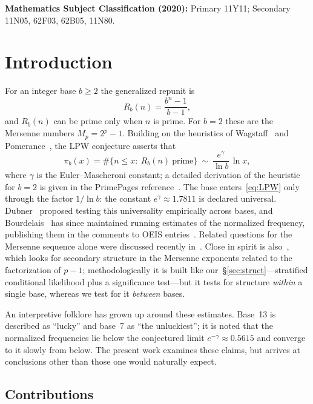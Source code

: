 \documentclass[11pt,a4paper]{article}
\theoremstyle{plain}
\theoremstyle{remark}
\newcommand{\Rb}{R_b}
\newcommand{\eg}{e^{\gamma}}
\newcommand{\emg}{e^{-\gamma}}
\begin{document}
\medskip
\noindent\textbf{Mathematics Subject Classification (2020):}
Primary 11Y11; Secondary 11N05, 62F03, 62B05, 11N80.

\section{Introduction}

For an integer base $b\ge2$ the generalized repunit is
\begin{equation}\label{eq:Rb}
\Rb(n)=\frac{b^{n}-1}{b-1},
\end{equation}
and $\Rb(n)$ can be prime only when $n$ is prime. For $b=2$ these are the
Mersenne numbers $M_p=2^{p}-1$. Building on the heuristics of
Wagstaff~\cite{wagstaff1983} and Pomerance~\cite{pomerance1981}, the LPW
conjecture asserts that
\begin{equation}\label{eq:LPW}
\pi_b(x)=\#\{n\le x:\ \Rb(n)\ \text{prime}\}\ \sim\ \frac{\eg}{\ln b}\,\ln x,
\end{equation}
where $\gamma$ is the Euler--Mascheroni constant; a detailed derivation of the
heuristic for $b=2$ is given in the PrimePages reference~\cite{t5k}. The base
enters~\eqref{eq:LPW} only through the factor $1/\ln b$: the constant
$\eg\approx1.7811$ is declared universal. Dubner~\cite{dubner1993} proposed
testing this universality empirically across bases, and
Bourdelais~\cite{bourdelais2009} has since maintained running estimates of the
normalized frequency, publishing them in the comments to OEIS
entries~\cite{oeis}. Related questions for the Mersenne sequence alone were
discussed recently in~\cite{wagstaff2025}. Close in spirit is
also~\cite{dominguez2026}, which looks for secondary structure in the Mersenne
exponents related to the factorization of $p-1$; methodologically it is built
like our~\S\ref{sec:struct}---stratified conditional likelihood plus a
significance test---but it tests for structure \emph{within} a single base,
whereas we test for it \emph{between} bases.

An interpretive folklore has grown up around these estimates. Base~13 is
described as ``lucky'' and base~7 as ``the unluckiest''; it is noted that the
normalized frequencies lie below the conjectured limit $\emg\approx0.5615$ and
converge to it slowly from below. The present work examines these claims, but
arrives at conclusions other than those one would naturally expect.

\subsection{Contributions}
\end{document}

